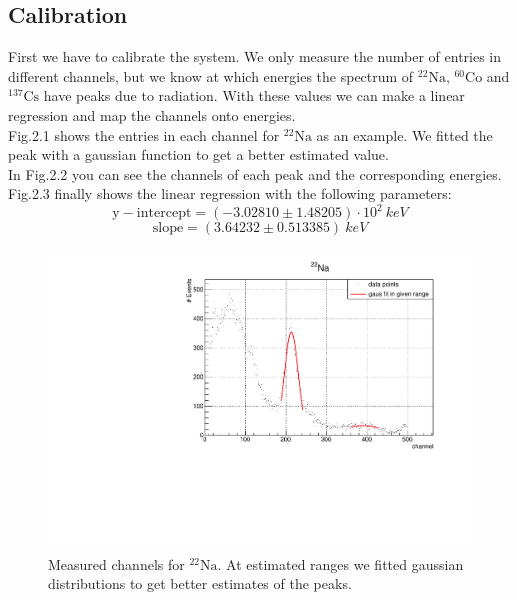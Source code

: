 \subsection{Calibration}

First we have to calibrate the system. We only measure the number of entries in different channels, but we know at which energies the spectrum of ${}^{22}\mathrm{Na}$, $^{60}\mathrm{Co}$ and $^{137}\mathrm{Cs}$ have peaks due to radiation. With these values we can make a linear regression and map the channels onto energies. \\
Fig.2.1 shows the entries in each channel for ${}^{22}\mathrm{Na}$ as an example. We fitted the peak with a gaussian function to get a better estimated value. \\
In Fig.2.2 you can see the channels of each peak and the corresponding energies. Fig.2.3 finally shows the linear regression with the following parameters:
$$\mathrm{y-intercept} = (-3.02810 \pm 1.48205) \cdot 10^{2} \ keV$$
$$\mathrm{slope} =  (3.64232 \pm 0.513385) \ keV$$

\begin{figure}[h]
\centering
\includegraphics[scale=0.5]{./../plots/calibration/NA_22_fit.pdf}
\caption{Measured channels for ${}^{22}\mathrm{Na}$. At estimated ranges we fitted gaussian distributions to get better estimates of the peaks.}
\end{figure}

\newpage

